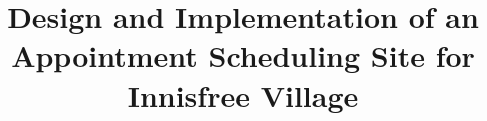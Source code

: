 \documentclass{sig-alternate}
\begin{document}
%

\title{Design and Implementation of an Appointment Scheduling Site for Innisfree Village}

%
%
%
%
%
\end{document}

